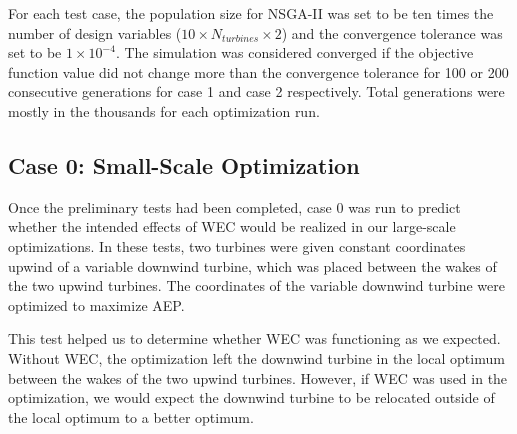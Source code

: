 \documentclass[a4paper]{jpconf}
\begin{document}
For each test case, the population size for NSGA-II was set to be ten times the number of design variables ($10\times N_{turbines} \times 2$) and the convergence tolerance was set to be $1\times10^{-4}$. The simulation was considered converged if the objective function value did not change more than the convergence tolerance for 100 or 200 consecutive generations for case 1 and case 2 respectively. Total generations were mostly in the thousands for each optimization run.



\subsection{Case 0: Small-Scale Optimization}
Once the preliminary tests had been completed, case 0 was run to predict whether the intended effects of WEC would be realized in our large-scale optimizations. In these tests, two turbines were given constant coordinates upwind of a variable downwind turbine, which was placed between the wakes of the two upwind turbines. The coordinates of the variable downwind turbine were optimized to maximize AEP.

This test helped us to determine whether WEC was functioning as we expected. Without WEC, the optimization left the downwind turbine in the local optimum between the wakes of the two upwind turbines. However, if WEC was used in the optimization, we would expect the downwind turbine to be relocated outside of the local optimum to a better optimum.
\end{document}
